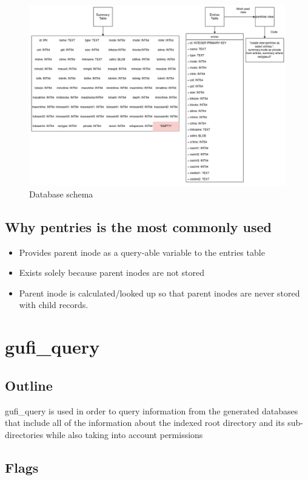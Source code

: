 \documentclass{article}
\begin{document}
\begin{figure} [h]
\centering
\includegraphics[width=1.0\textwidth]{Database_Schemas.png}
\caption{\label{fig:Database Schema}Database schema}
\end{figure}

\subsection{Why pentries is the most commonly used}
\begin{itemize}
  \item Provides parent inode as a query-able variable to the entries table
  \item Exists solely because parent inodes are not stored
  \item Parent inode is calculated/looked up so that parent inodes are never stored with child records.
\end{itemize}

\clearpage

\section{gufi\_query}

\subsection{Outline}

gufi\_query is used in order to query information from the generated databases that include all of the information about the indexed root directory and its sub-directories while also taking into account permissions 
\subsection{Flags}
\end{document}
